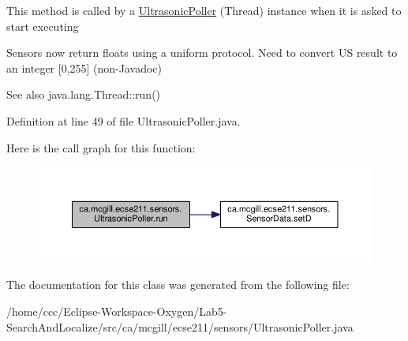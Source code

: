 This method is called by a \hyperlink{classca_1_1mcgill_1_1ecse211_1_1sensors_1_1_ultrasonic_poller}{Ultrasonic\+Poller} (Thread) instance when it is asked to start executing

Sensors now return floats using a uniform protocol. Need to convert US result to an integer \mbox{[}0,255\mbox{]} (non-\/\+Javadoc)

\begin{DoxySeeAlso}{See also}
java.\+lang.\+Thread\+::run() 
\end{DoxySeeAlso}


Definition at line 49 of file Ultrasonic\+Poller.\+java.

Here is the call graph for this function\+:\nopagebreak
\begin{figure}[H]
\begin{center}
\leavevmode
\includegraphics[width=350pt]{classca_1_1mcgill_1_1ecse211_1_1sensors_1_1_ultrasonic_poller_acc71fac612a72c197244c71d6cf7b6e1_cgraph}
\end{center}
\end{figure}


The documentation for this class was generated from the following file\+:\begin{DoxyCompactItemize}
\item 
/home/ccc/\+Eclipse-\/\+Workspace-\/\+Oxygen/\+Lab5-\/\+Search\+And\+Localize/src/ca/mcgill/ecse211/sensors/Ultrasonic\+Poller.\+java\end{DoxyCompactItemize}
